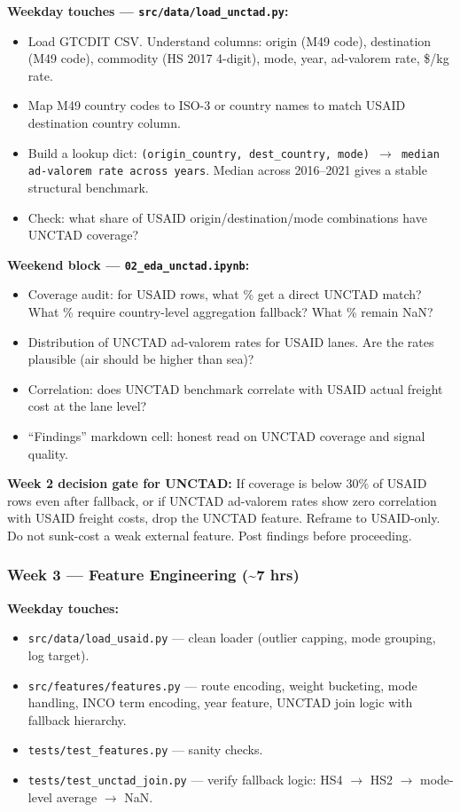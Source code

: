 \documentclass[11pt, a4paper]{article}
\begin{document}
\textbf{Weekday touches --- \texttt{src/data/load\_unctad.py}:}
\begin{itemize}[noitemsep]
  \item Load GTCDIT CSV. Understand columns: origin (M49 code), destination (M49 code), commodity (HS 2017 4-digit), mode, year, ad-valorem rate, \$/kg rate.
  \item Map M49 country codes to ISO-3 or country names to match USAID destination country column.
  \item Build a lookup dict: \texttt{(origin\_country, dest\_country, mode) $\rightarrow$ median ad-valorem rate across years}. Median across 2016--2021 gives a stable structural benchmark.
  \item Check: what share of USAID origin/destination/mode combinations have UNCTAD coverage?
\end{itemize}

\textbf{Weekend block --- \texttt{02\_eda\_unctad.ipynb}:}
\begin{itemize}[noitemsep]
  \item Coverage audit: for USAID rows, what \% get a direct UNCTAD match? What \% require country-level aggregation fallback? What \% remain NaN?
  \item Distribution of UNCTAD ad-valorem rates for USAID lanes. Are the rates plausible (air should be higher than sea)?
  \item Correlation: does UNCTAD benchmark correlate with USAID actual freight cost at the lane level?
  \item ``Findings'' markdown cell: honest read on UNCTAD coverage and signal quality.
\end{itemize}

\begin{warnbox}
\textbf{Week 2 decision gate for UNCTAD:} If coverage is below 30\% of USAID rows even after fallback, or if UNCTAD ad-valorem rates show zero correlation with USAID freight costs, drop the UNCTAD feature. Reframe to USAID-only. Do not sunk-cost a weak external feature. Post findings before proceeding.
\end{warnbox}

\subsubsection*{Week 3 --- Feature Engineering (\textasciitilde{}7 hrs)}

\textbf{Weekday touches:}
\begin{itemize}[noitemsep]
  \item \texttt{src/data/load\_usaid.py} --- clean loader (outlier capping, mode grouping, log target).
  \item \texttt{src/features/features.py} --- route encoding, weight bucketing, mode handling, INCO term encoding, year feature, UNCTAD join logic with fallback hierarchy.
  \item \texttt{tests/test\_features.py} --- sanity checks.
  \item \texttt{tests/test\_unctad\_join.py} --- verify fallback logic: HS4 $\rightarrow$ HS2 $\rightarrow$ mode-level average $\rightarrow$ NaN.
\end{itemize}
\end{document}

